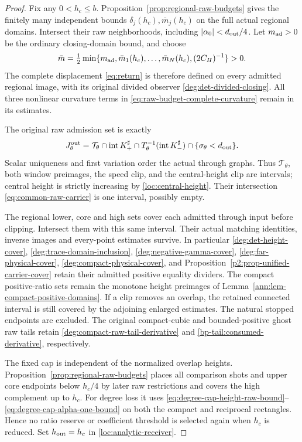 \begin{proof}
Fix any \(0<h_c\le b\). Proposition~\ref{prop:regional-raw-budgets}
gives the finitely many independent bounds
\(\delta_j(h_c),\bar m_j(h_c)\) on the full actual regional
domains. Intersect their raw neighborhoods, including
\(|\alpha_0|<d_{\rm out}/4\). Let \(m_{\rm ad}>0\) be the
ordinary closing-domain bound, and choose
\begin{equation}\label{eq:common-multiplier-bound}
\bar m=\tfrac12\min\{m_{\rm ad},\bar m_1(h_c),\ldots,
                          \bar m_N(h_c),(2C_H)^{-1}\}>0.
\end{equation}
The complete displacement \eqref{eq:return} is therefore defined
on every admitted regional image, with its original divided observer
\eqref{deg:det-divided-closing}. All three nonlinear curvature terms
in \eqref{eq:raw-budget-complete-curvature} remain in its estimates.

The original raw admission set is exactly
\[
J_\theta^{\rm out}=
\mathcal T_\theta\cap\operatorname{int}K_+^\sharp
\cap T_\theta^{-1}(\operatorname{int}K_-^\sharp)
\cap\{\sigma_\theta<d_{\rm out}\}.
\]
Scalar uniqueness and first variation order the actual through graphs.
Thus \(\mathcal T_\theta\), both window preimages, the speed clip,
and the central-height clip are intervals; central height is strictly
increasing by \eqref{loc:central-height}. Their intersection
\eqref{eq:common-raw-carrier} is one interval, possibly empty.

The regional lower, core and high sets cover each admitted through
input before clipping. Intersect them with this same interval. Their
actual matching identities, inverse images and every-point estimates
survive. In particular \eqref{deg:det-height-cover},
\eqref{deg:trace-domain-inclusion}, \eqref{deg:negative-gamma-cover},
\eqref{deg:far-physical-cover}, \eqref{deg:compact-physical-cover},
and Proposition~\ref{p2:prop-unified-carrier-cover} retain their
admitted positive equality dividers. The compact positive-ratio sets
remain the monotone height preimages of
Lemma~\ref{ann:lem-compact-positive-domains}. If a clip removes an
overlap, the retained connected interval is still covered by the
adjoining enlarged estimates. The natural stopped endpoints are
excluded. The original compact-cubic and bounded-positive ghost raw
tails retain \eqref{deg:compact-raw-tail-derivative} and
\eqref{bp-tail:consumed-derivative}, respectively.

The fixed cap is independent of the normalized overlap heights.
Proposition~\ref{prop:regional-raw-budgets} places all comparison
shots and upper core endpoints below \(h_c/4\) by later raw
restrictions and covers the high complement up to \(h_c\).
For degree loss it uses
\eqref{eq:degree-cap-height-raw-bound}--\eqref{eq:degree-cap-alpha-one-bound}
on both the compact and reciprocal rectangles. Hence no ratio reserve
or coefficient threshold is selected again when \(h_c\) is reduced.
Set \(h_{\rm out}=h_c\) in \eqref{loc:analytic-receiver}.


\end{proof}
